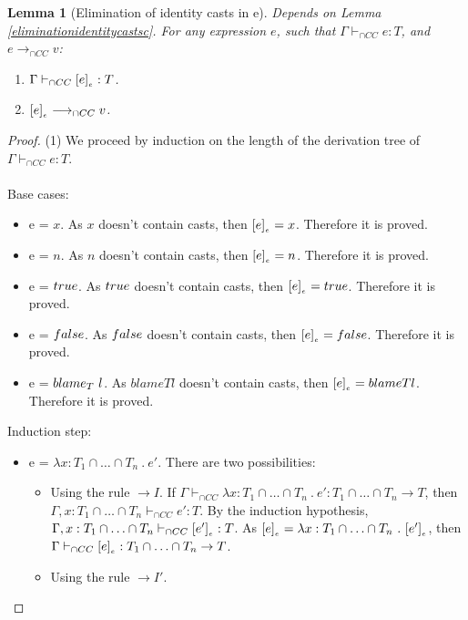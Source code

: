 \documentclass[a4paper]{article}
\newtheorem{lemma}{Lemma}
\begin{document}
\begin{lemma}[Elimination of identity casts in e]
\label{eliminationidentitycastse}
Depends on Lemma \ref{eliminationidentitycastsc}.
For any expression $e$, such that $\Gamma \vdash_{\cap CC} e : T$, and $e \longrightarrow_{\cap CC} v$:
\begin{enumerate}
    \item $\Gamma \vdash_{\cap CC} [e]_{_e} : T$.
    \item $[e]_{_e} \longrightarrow_{\cap CC} v$.
\end{enumerate}
\end{lemma}
\begin{proof}
(1) We proceed by induction on the length of the derivation tree of $\Gamma \vdash_{\cap CC} e : T$.\\\\
Base cases:
\begin{itemize}
    \item e = $x$.
    As $x$ doesn't contain casts, then $[e]_{_e} = x$.
    Therefore it is proved.
    \item e = $n$.
    As $n$ doesn't contain casts, then $[e]_{_e} = n$.
    Therefore it is proved.
    \item e = $true$.
    As $true$ doesn't contain casts, then $[e]_{_e} = true$.
    Therefore it is proved.
    \item e = $false$.
    As $false$ doesn't contain casts, then $[e]_{_e} = false$.
    Therefore it is proved.
    \item e = $blame_{T}\ l$.
    As $blame{T}{l}$ doesn't contain casts, then $[e]_{_e} = blame{T}{l}$.
    Therefore it is proved.
\end{itemize}
Induction step:
\begin{itemize}
    \item e = $\lambda x : T_1 \cap \ldots \cap T_n\ .\ e'$.
    There are two possibilities:
    \begin{itemize}
        \item Using the rule ${\rightarrow} I$.
        If $\Gamma \vdash_{\cap CC} \lambda x : T_1 \cap \ldots \cap T_n\ .\ e' : T_1 \cap \ldots \cap T_n \rightarrow T$, then $\Gamma, x : T_1 \cap \ldots \cap T_n \vdash_{\cap CC} e' : T$.
        By the induction hypothesis, $\Gamma, x : T_1 \cap \ldots \cap T_n \vdash_{\cap CC} [e']_{_e} : T$.
        As $\erasee{e} = \lambda x : T_1 \cap \ldots \cap T_n\ .\ \erasee{e'}$, then $\Gamma \vdash_{\cap CC} [e]_{_e} : T_1 \cap \ldots \cap T_n \rightarrow T$.
        \item Using the rule ${\rightarrow} I'$.

\end{itemize}
\end{itemize}
\end{proof}
\end{document}
